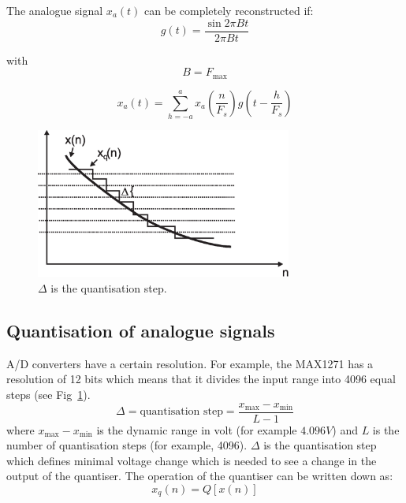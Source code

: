 \documentclass[12pt,a4paper]{article}
\begin{document}
The analogue signal $x_{a}(t)$ can be completely reconstructed if:
\begin{equation}
g(t) = \frac{\sin 2\pi Bt}{2 \pi Bt}
\end{equation}

with
\begin{equation}
B = F_{\mbox{max}}
\end{equation}

\begin{equation}
x_{a}(t) = \sum_{h= -a}^{a}x_{a}(\frac{n}{F_s})g(t - \frac{h}{F_s})
\end{equation}




\begin{figure}[!hbt]
\begin{center}
\mbox{\includegraphics[width=0.75\textwidth]{quant_overv}}
\end{center}
\caption{$\Delta$ is the quantisation step.
\label{quant_overv}}
\end{figure}



\subsection{Quantisation of analogue signals}
A/D converters have a certain resolution. For example, the MAX1271 has a
resolution of 12 bits which means that it divides the input range into
4096 equal steps (see Fig~\ref{quant_overv}).
\begin{equation}
\Delta = \mbox{quantisation step} = 
\frac{x_{\mbox{max}} - x_{\mbox{min}}}{L - 1}
\end{equation}
where $x_{\mbox{max}} - x_{\mbox{min}}$ is the dynamic range in volt
(for example $4.096V$) and $L$ is the number of quantisation steps
(for example, 4096). $\Delta$ is the quantisation step which defines
minimal voltage change which is needed to see a change in the output
of the quantiser. The operation of the quantiser can be written down
as:
\begin{equation}
x_{q}(n) = Q[x(n)]
\end{equation}
\end{document}
